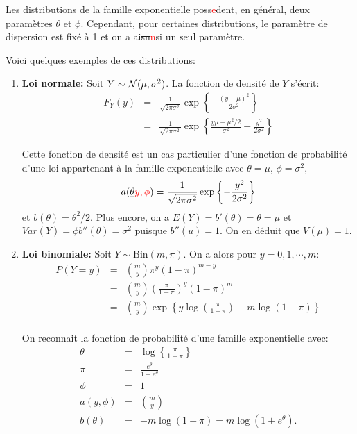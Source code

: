 \documentclass[11pt]{article}
\begin{document}
\noindent Les distributions de la famille exponentielle poss\`\textcolor{red}{e}dent, en g\'en\'eral, deux param\`etres $\theta$ et $\phi$. Cependant, pour certaines distributions, le param\`etre de dispersion est fix\'e \`a 1 et on a ai\sout{sn}\textcolor{red}{n}si un seul param\`etre.

\noindent Voici quelques exemples de ces distributions:
\begin{enumerate}
\item[$\bullet$] {\bf Loi normale:} Soit $Y \sim {\cal N}(\mu,\sigma^2)$. La fonction de densit\'e de $Y$ s'\'ecrit:
\begin{eqnarray*}
F_Y(y)&=&\frac{1}{\sqrt{2\pi \sigma^2}} \exp\left\{-\frac{(y-\mu)^2}{2\sigma^2}\right\} \\
&=& \frac{1}{\sqrt{2\pi \sigma^2}} \exp\left\{\frac{y\mu-\mu^2/2}{\sigma^2}-\frac{y^2}{2\sigma^2}\right\}
\end{eqnarray*}

Cette fonction de densit\'e est un cas particulier d'une fonction de probabilit\'e d'une loi appartenant \`a la famille exponentielle avec $\theta=\mu$, $\phi=\sigma^2$, $$a(\sout{\theta}\textcolor{red}{y,\phi})=\frac{1}{\sqrt{2\pi \sigma^2}} \exp\left\{-\frac{y^2}{2\sigma^2}\right\}$$ et $b(\theta)=\theta^2/2$. Plus encore, on a $E(Y)=b'(\theta)=\theta=\mu$ et $Var(Y)=\phi b''(\theta) = \sigma^2$ puisque $b''(u)=1$. On en d\'eduit que $V(\mu)=1$.

\item[$\bullet$]{\bf Loi binomiale:} Soit $Y \sim \mbox{Bin}(m,\pi)$. On a alors pour $y=0,1,\cdots,m$:
\begin{eqnarray*}
P(Y=y) &=& \binom{m}{y} \pi^y (1-\pi)^{m-y}\\
&=& \binom{m}{y} \left(\frac{\pi}{1-\pi}\right)^y (1-\pi)^m \\
&=& \binom{m}{y} \exp\left\{y \log\left(\frac{\pi}{1-\pi}\right) +m\log(1-\pi)\right\} \\
\end{eqnarray*}

On reconnait la fonction de probabilit\'e d'une famille exponentielle avec:
\begin{eqnarray*}
\theta &=& \log\left\{\frac{\pi}{1-\pi}\right\} \\
\pi&=& \frac{e^{\theta}}{1+e^{\theta}} \\
\phi&=&1 \\
a(y,\phi)&=& \binom{m}{y} \\
b(\theta)&=&-m\log(1-\pi) = m\log(1+e^{\theta}).
\end{eqnarray*}


\end{enumerate}
\end{document}
